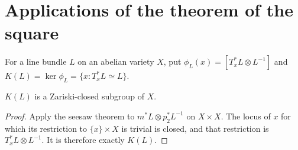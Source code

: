 
\section{Applications of the theorem of the square}
\label{mumford-source-II6-applications}

For a line bundle $L$ on an abelian variety $X$, put
$\phi_L(x)=[T_x^*L\otimes L^{-1}]$ and
$K(L)=\ker\phi_L=\{x:T_x^*L\simeq L\}$.

\begin{proposition}
\label{mumford-prop-KL-closed}
$K(L)$ is a Zariski-closed subgroup of $X$.
\end{proposition}
\begin{proof}
Apply the seesaw theorem to $m^*L\otimes p_2^*L^{-1}$ on $X\times X$.
The locus of $x$ for which its restriction to $\{x\}\times X$ is trivial is
closed, and that restriction is $T_x^*L\otimes L^{-1}$.  It is therefore
exactly $K(L)$.
\end{proof}

